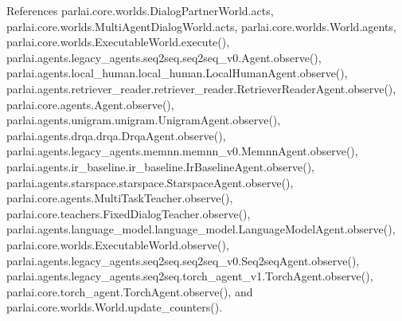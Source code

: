References parlai.\+core.\+worlds.\+Dialog\+Partner\+World.\+acts, parlai.\+core.\+worlds.\+Multi\+Agent\+Dialog\+World.\+acts, parlai.\+core.\+worlds.\+World.\+agents, parlai.\+core.\+worlds.\+Executable\+World.\+execute(), parlai.\+agents.\+legacy\+\_\+agents.\+seq2seq.\+seq2seq\+\_\+v0.\+Agent.\+observe(), parlai.\+agents.\+local\+\_\+human.\+local\+\_\+human.\+Local\+Human\+Agent.\+observe(), parlai.\+agents.\+retriever\+\_\+reader.\+retriever\+\_\+reader.\+Retriever\+Reader\+Agent.\+observe(), parlai.\+core.\+agents.\+Agent.\+observe(), parlai.\+agents.\+unigram.\+unigram.\+Unigram\+Agent.\+observe(), parlai.\+agents.\+drqa.\+drqa.\+Drqa\+Agent.\+observe(), parlai.\+agents.\+legacy\+\_\+agents.\+memnn.\+memnn\+\_\+v0.\+Memnn\+Agent.\+observe(), parlai.\+agents.\+ir\+\_\+baseline.\+ir\+\_\+baseline.\+Ir\+Baseline\+Agent.\+observe(), parlai.\+agents.\+starspace.\+starspace.\+Starspace\+Agent.\+observe(), parlai.\+core.\+agents.\+Multi\+Task\+Teacher.\+observe(), parlai.\+core.\+teachers.\+Fixed\+Dialog\+Teacher.\+observe(), parlai.\+agents.\+language\+\_\+model.\+language\+\_\+model.\+Language\+Model\+Agent.\+observe(), parlai.\+core.\+worlds.\+Executable\+World.\+observe(), parlai.\+agents.\+legacy\+\_\+agents.\+seq2seq.\+seq2seq\+\_\+v0.\+Seq2seq\+Agent.\+observe(), parlai.\+agents.\+legacy\+\_\+agents.\+seq2seq.\+torch\+\_\+agent\+\_\+v1.\+Torch\+Agent.\+observe(), parlai.\+core.\+torch\+\_\+agent.\+Torch\+Agent.\+observe(), and parlai.\+core.\+worlds.\+World.\+update\+\_\+counters().

